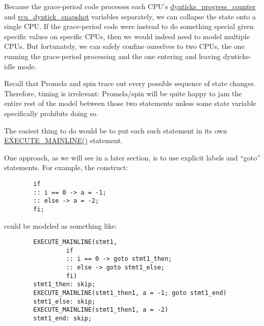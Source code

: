 	Because the grace-period code processes each
	CPU's \url{dynticks_progress_counter} and
	\url{rcu_dyntick_snapshot} variables separately,
	we can collapse the state onto a single CPU.
	If the grace-period code were instead to do something special
	given specific values on specific CPUs, then we would indeed need
	to model multiple CPUs.
	But fortunately, we can safely confine ourselves to two CPUs, the
	one running the grace-period processing and the one entering and
	leaving dynticks-idle mode.


	Recall that Promela and spin trace out
	every possible sequence of state changes.
	Therefore, timing is irrelevant: Promela/spin will be quite
	happy to jam the entire rest of the model between those two
	statements unless some state variable specifically prohibits
	doing so.


	The easiest thing to do would be to put
	each such statement in its own \url{EXECUTE_MAINLINE()}
	statement.


	One approach, as we will see in a later section,
	is to use explicit labels and ``goto'' statements.
	For example, the construct:

	\vspace{5pt}
	\begin{minipage}[t]{\columnwidth}
	\scriptsize
	\begin{verbatim}
		if
		:: i == 0 -> a = -1;
		:: else -> a = -2;
		fi;
	\end{verbatim}
	\end{minipage}
	\vspace{5pt}

	could be modeled as something like:

	\vspace{5pt}
	\begin{minipage}[t]{\columnwidth}
	\scriptsize
	\begin{verbatim}
		EXECUTE_MAINLINE(stmt1,
				 if
				 :: i == 0 -> goto stmt1_then;
				 :: else -> goto stmt1_else;
				 fi)
		stmt1_then: skip;
		EXECUTE_MAINLINE(stmt1_then1, a = -1; goto stmt1_end)
		stmt1_else: skip;
		EXECUTE_MAINLINE(stmt1_then1, a = -2)
		stmt1_end: skip;
	\end{verbatim}
	\end{minipage}
	\vspace{5pt}

